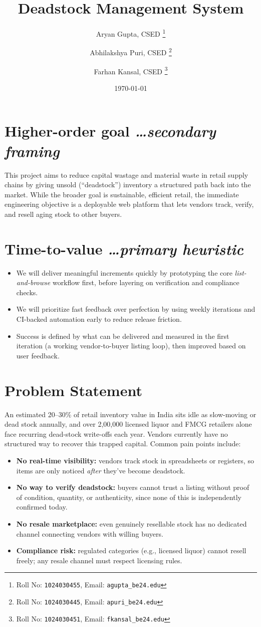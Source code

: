 \documentclass[11pt,a4paper]{article}
\title{Deadstock Management System}
\author{
  Aryan Gupta, CSED%
  \thanks{Roll No: \texttt{1024030455}, %
    Email: \texttt{agupta\_be24\@thapar.edu}}
  \and
  Abhilakshya Puri, CSED%
  \thanks{Roll No: \texttt{1024030445}, %
    Email: \texttt{apuri\_be24\@thapar.edu}}
  \and
  Farhan Kansal, CSED%
  \thanks{Roll No: \texttt{1024030451}, %
    Email: \texttt{fkansal\_be24\@thapar.edu}}
}
\date{\today}
\newcommand{\BvrHint}[1]{%
  {\normalfont\normalsize\itshape\hfill #1}}
\begin{document}
\maketitle

\section{Higher-order goal%
  \BvrHint{\ldots secondary framing}}
This project aims to reduce capital wastage and material
waste in retail supply chains by giving unsold
(``deadstock'') inventory a structured path back into the
market. While the broader goal is sustainable, efficient
retail, the immediate engineering objective is a
deployable web platform that lets vendors track, verify,
and resell aging stock to other buyers.

\section{Time-to-value %
\BvrHint{\ldots primary heuristic}}
\begin{itemize}[leftmargin=0.7cm]
    \item We will deliver meaningful increments quickly by prototyping the core \emph{list-and-browse} workflow first, before layering on verification and compliance checks.
    \item We will prioritize fast feedback over perfection by using weekly iterations and CI-backed automation early to reduce release friction.
    \item Success is defined by what can be delivered and measured in the first iteration (a working vendor-to-buyer listing loop), then improved based on user feedback.
\end{itemize}

\section{Problem Statement}
An estimated 20--30\% of retail inventory value in India
sits idle as slow-moving or dead stock annually, and
over 2,00,000 licensed liquor and FMCG retailers alone
face recurring dead-stock write-offs each year. Vendors
currently have no structured way to recover this trapped
capital. Common pain points include:
\begin{itemize}[leftmargin=0.7cm]
    \item \textbf{No real-time visibility:} vendors track stock in spreadsheets or registers, so items are only noticed \emph{after} they've become deadstock.
    \item \textbf{No way to verify deadstock:} buyers cannot trust a listing without proof of condition, quantity, or authenticity, since none of this is independently confirmed today.
    \item \textbf{No resale marketplace:} even genuinely resellable stock has no dedicated channel connecting vendors with willing buyers.
    \item \textbf{Compliance risk:} regulated categories (e.g., licensed liquor) cannot resell freely; any resale channel must respect licensing rules.
\end{itemize}
\end{document}
